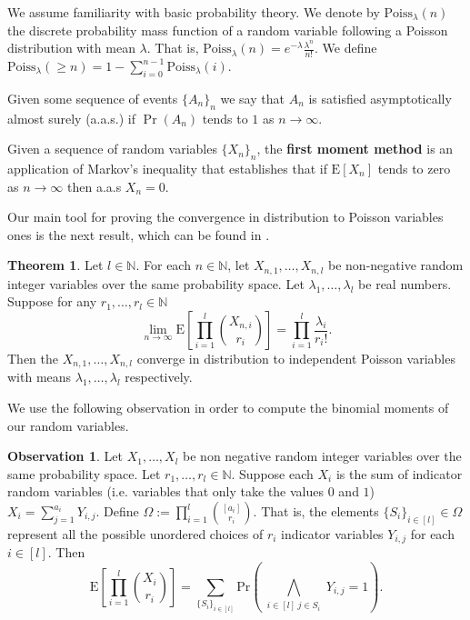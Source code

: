 \documentclass[12pt,notitlepage,a4paper]{article}
\theoremstyle{definition}
\newtheorem{theorem}{Theorem}[section]
\newtheorem{obs}{Observation}[section]
\newcommand{\N}{\mathbb{N}}
\newcommand{\Ln}{\lim\limits_{n\to \infty}}
\begin{document}
We assume familiarity with basic probability theory. 
We denote by $\mathrm{Poiss}_\lambda(n)$ the discrete probability mass
function of a random variable following a Poisson distribution with
mean $\lambda$. That is, $\mathrm{Poiss}_\lambda(n)=e^{-\lambda}\frac{\lambda^n}{n!}$.
We define $\mathrm{Poiss}_\lambda(\geq n)=1 - \sum_{i=0}^{n-1} \mathrm{Poiss}_\lambda(i)$. \par
Given some sequence of events $\{A_n\}_n$ we say that $A_n$ is 
satisfied asymptotically
almost surely (a.a.s.) if $\Pr(A_n)$ tends to $1$ as $n\to \infty$.\par
Given a sequence of random variables $\{X_n\}_n$, the \textbf{first moment method}
is an application of Markov's inequality that establishes that if $\mathrm{E}[X_n]$
tends to zero as $n\to \infty$ then a.a.s $X_n=0$.\par

Our main tool for proving the convergence in distribution 
to Poisson variables ones is the next result, which can
be found in \cite[Theorem 1.23]{bollobas2001random}.

\begin{theorem} \label{thm:BrunSieve}
	Let $l\in \N$. For each 
	$n\in \N$, let $X_{n,1},\dots, X_{n,l}$ be non-negative
	random integer variables over the same
	probability space. Let $\lambda_1,\dots,\lambda_l$ 
	be real numbers. Suppose for any $r_1,\dots,r_l \in \N$
	\[ 
	\Ln \mathrm{E}\left[
	\prod_{i=1}^{l} \binom{X_{n,i}}{r_i} \right]
	= \prod_{i=1}^{l} \frac{\lambda_i}{r_i !}.	
	\]
	Then the $X_{n,1},\dots,X_{n,l}$ converge in distribution to
	independent Poisson variables with means $\lambda_1,\dots,\lambda_l$ 
	respectively. 
\end{theorem}

We use the following observation in order to compute the binomial moments of 
our random variables.

\begin{obs} \label{obs:binomialmean} Let $X_1,\dots, X_l$ be non negative
	random integer variables over the same probability space. 
	Let $r_1,\dots,r_l\in \N$.	Suppose
	each $X_i$ is the sum of indicator random variables
	(i.e. variables that only take the values $0$ and $1$)
	$X_i=\sum_{j=1}^{a_i} Y_{i,j}$. Define 
	$\Omega:=\prod_{i=1}^l \binom{[a_i]}{r_i}$. That is,
	the elements $\{S_i\}_{i\in[l]}\in \Omega$
	represent all the possible unordered choices of 
	$r_i$ indicator variables $Y_{i,j}$ for each $i\in [l]$.
	Then 
	\[
	\mathrm{E}\left[
	\prod_{i=1}^{l} \binom{X_i}{r_i}\right]=
	\sum_{\{S_i\}_{i\in [l]}} \mathrm{Pr}\left(
	\bigwedge_{\substack{i\in [l]\ j\in S_i}} Y_{i,j}=1
	\right).	
	\]
\end{obs} 
\end{document}
